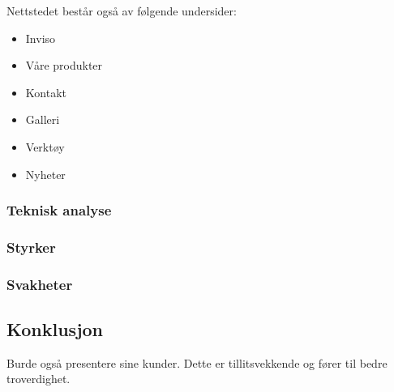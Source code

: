 Nettstedet består også av følgende undersider:
\begin{itemize}
\item Inviso
\item Våre produkter
\item Kontakt
\item Galleri
\item Verktøy
\item Nyheter
\end{itemize}


\subsubsection{Teknisk analyse}

\subsubsection{Styrker}

\subsubsection{Svakheter}

\subsection{Konklusjon}

Burde også presentere sine kunder. Dette er tillitsvekkende og fører til bedre troverdighet.

\clearpage